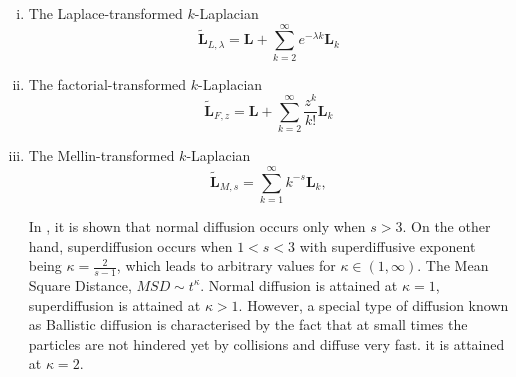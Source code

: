 \documentclass[10pt,a4paper]{article}
\begin{document}
\begin{enumerate}[i)]
    	    	\item The Laplace-transformed $k$-Laplacian
    	    	\begin{equation}
    	    	\tilde{\mathbf{L}}_{L,\lambda} = \mathbf{L} + \sum_{k=2}^{\infty} e^{-\lambda k} \mathbf{L}_k 
    	    	\label{laplacetransform}
    	    	\end{equation}
    	    	\item The factorial-transformed $k$-Laplacian
    	    	\begin{equation}
    	    	\tilde{\mathbf{L}}_{F,z} =  \mathbf{L} + \sum_{k=2}^{\infty} \frac{z^k}{k!} \mathbf{L}_k 
    	    	\end{equation}
    	    	\item The Mellin-transformed $k$-Laplacian
    	    	\begin{equation}
    	    	\tilde{\mathbf{L}}_{M,s} = \sum_{k=1}^{\infty} k^{-s} \mathbf{L}_k,
    	    	\label{mellin-transforms}
    	    	\end{equation}
    	    	
    	    	In \citep{estrada2017path}, it is shown that normal diffusion occurs only when $s > 3$. On the other hand, superdiffusion occurs when $1 <s < 3$ with superdiffusive exponent being $ \kappa = \frac{2}{s-1}$,
    	    	which leads to arbitrary values for $\kappa \in (1,\infty)$. 
    	    	The Mean Square Distance, $MSD \sim t^\kappa$. Normal diffusion is attained  at $\kappa =1$, superdiffusion is attained at $\kappa > 1$. However, a special type of diffusion known as Ballistic diffusion is characterised by the fact that at small times the particles are not hindered yet
    	    	by collisions and diffuse very fast. it is attained at $\kappa = 2$.
    	    \end{enumerate}
        
\end{document}
